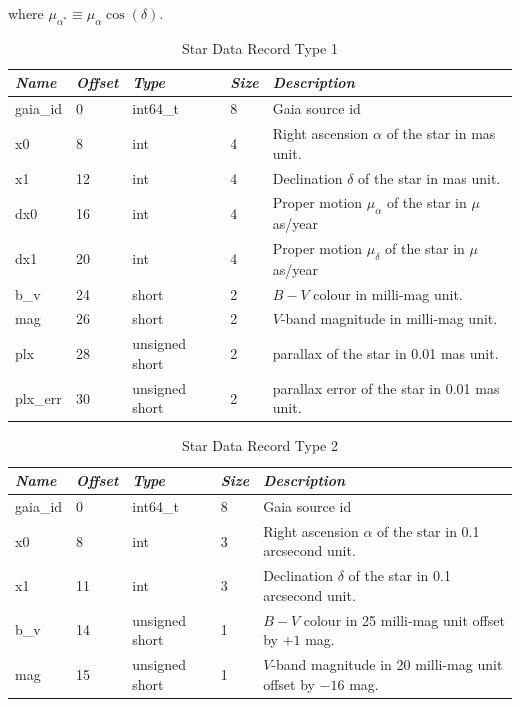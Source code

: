 where $\mu_{\alpha^*}\equiv\mu_{\alpha}\cos{(\delta)}$.


\begin{table}[htbp]
\begin{tabularx}{\textwidth}{llllX}\toprule
\emph{Name} & \emph{Offset}& \emph{Type} & \emph{Size} &\emph{Description}\\\midrule
gaia\_id       &  0 & int64\_t           & 8 & Gaia source id\\%
x0             &  8 & int                & 4 & Right ascension $\alpha$ of the star in mas unit.\\
x1             & 12 & int                & 4 & Declination $\delta$ of the star in mas unit.\\%
dx0            & 16 & int                & 4 & Proper motion $\mu_{\alpha}$ of the star in $\mu$as/year\\
dx1            & 20 & int                & 4 & Proper motion $\mu_{\delta}$ of the star in $\mu$as/year\\%
b\_v           & 24 & short              & 2 & $B-V$ colour in milli-mag unit.\\
mag            & 26 & short              & 2 & $V$-band magnitude in milli-mag unit.\\
plx            & 28 & unsigned short     & 2 & parallax of the star in 0.01 mas unit.\\
plx\_err       & 30 & unsigned short     & 2 & parallax error of the star in 0.01 mas unit.\\\bottomrule
\end{tabularx}
\caption{Star Data Record Type 1}
\label{tab:StarDataRecord1}
\end{table}


\begin{table}[htbp]
\begin{tabularx}{\textwidth}{llllX}\toprule
\emph{Name} & \emph{Offset} & \emph{Type} & \emph{Size} & \emph{Description}\\\midrule
gaia\_id       &  0 & int64\_t           & 8 & Gaia source id\\
x0             &  8 & int                & 3 & Right ascension $\alpha$ of the star in 0.1 arcsecond unit.\\
x1             & 11 & int                & 3 & Declination $\delta$ of the star in 0.1 arcsecond unit.\\
b\_v           & 14 & unsigned short     & 1 & $B-V$ colour in 25 milli-mag unit offset by $+1$ mag.\\
mag            & 15 & unsigned short     & 1 & $V$-band magnitude in 20 milli-mag unit offset by $-16$ mag.\\\bottomrule
\end{tabularx}
\caption{Star Data Record Type 2}
\label{tab:StarDataRecord2}
\end{table}


